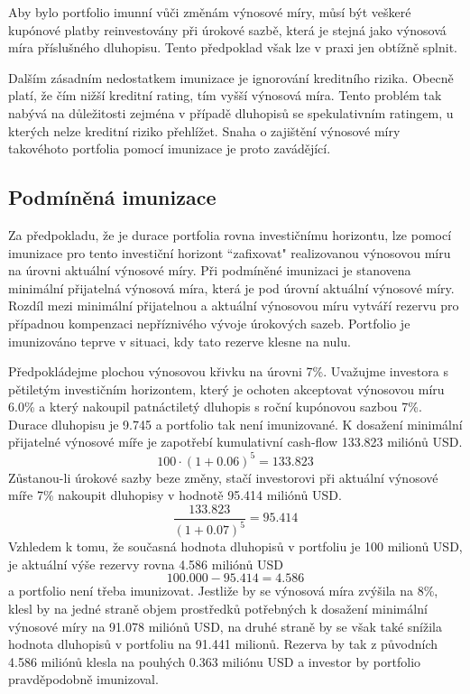 \documentclass[a4paper]{book}
\begin{document}
Aby bylo portfolio imunní vůči změnám výnosové míry, můsí být veškeré kupónové platby reinvestovány při úrokové sazbě, která je stejná jako výnosová míra příslušného dluhopisu. Tento předpoklad však lze v praxi jen obtížně splnit.

Dalším zásadním nedostatkem imunizace je ignorování kreditního rizika. Obecně platí, že čím nižší kreditní rating, tím vyšší výnosová míra. Tento problém tak nabývá na důležitosti zejména v případě dluhopisů se spekulativním ratingem, u kterých nelze kreditní riziko přehlížet. Snaha o zajištění výnosové míry takovéhoto portfolia pomocí imunizace je proto zavádějící.

\subsection{Podmíněná imunizace}

Za předpokladu, že je durace portfolia rovna investičnímu horizontu, lze pomocí imunizace pro tento investiční horizont ``zafixovat" realizovanou výnosovou míru na úrovni aktuální výnosové míry. Při podmíněné imunizaci je stanovena minimální přijatelná výnosová míra, která je pod úrovní aktuální výnosové míry. Rozdíl mezi minimální přijatelnou a aktuální výnosovou míru vytváří rezervu pro případnou kompenzaci nepříznivého vývoje úrokových sazeb. Portfolio je imunizováno teprve v situaci, kdy tato rezerve klesne na nulu.

Předpokládejme plochou výnosovou křivku na úrovni 7\%. Uvažujme investora s pětiletým investičním horizontem, který je ochoten akceptovat výnosovou míru 6.0\% a který nakoupil patnáctiletý dluhopis s roční kupónovou sazbou 7\%. Durace dluhopisu je 9.745 a portfolio tak není imunizované. K dosažení minimální přijatelné výnosové míře je zapotřebí kumulativní cash-flow 133.823 miliónů USD. 
\begin{equation*}
100 \cdot (1 + 0.06)^5 = 133.823
\end{equation*}
Zůstanou-li úrokové sazby beze změny, stačí investorovi při aktuální výnosové míře 7\% nakoupit dluhopisy v hodnotě 95.414 miliónů USD.
\begin{equation*}
\frac{133.823}{(1 + 0.07)^5} = 95.414
\end{equation*}
Vzhledem k tomu, že současná hodnota dluhopisů v portfoliu je 100 milionů USD, je aktuální výše rezervy rovna 4.586 miliónů USD
\begin{equation*}
100.000 - 95.414 = 4.586
\end{equation*}
a portfolio není třeba imunizovat. Jestliže by se výnosová míra zvýšila na 8\%, klesl by na jedné straně objem prostředků potřebných k dosažení minimální výnosové míry na 91.078 miliónů USD, na druhé straně by se však také snížila hodnota dluhopisů v portfoliu na 91.441 milionů. Rezerva by tak z původních 4.586 miliónů klesla na pouhých 0.363 miliónu USD a investor by portfolio pravděpodobně imunizoval.
\end{document}
